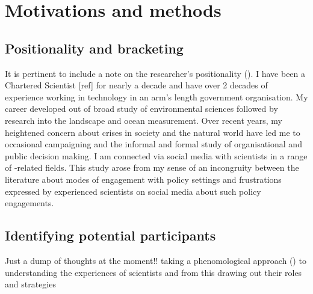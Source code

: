 \chapter{Motivations and methods}\label{ch:methods}


\section{Positionality and bracketing}

It is pertinent  to include a note on the researcher's positionality (\cite{CreswellP2017}). I have been a Chartered Scientist [ref] for nearly a decade and have over 2 decades of experience working in technology in an arm's length government organisation. My career developed out of broad study of environmental sciences followed by research into the landscape and ocean measurement. Over recent years, my heightened concern about crises in society and the natural world have led me to occasional campaigning and the informal and formal study of organisational and public decision making. I am connected via social media with scientists in a range of \CAN-related fields. This study arose from my sense of an incongruity between the literature about modes of engagement with policy settings and frustrations expressed by experienced scientists on social media about such policy engagements.


\section{Identifying potential participants}\label{sec:metidentify}

Just a dump of thoughts at the moment!!
taking a phenomological approach (\cite{CreswellP2017}) to understanding the experiences of scientists and from this drawing out their roles and strategies

